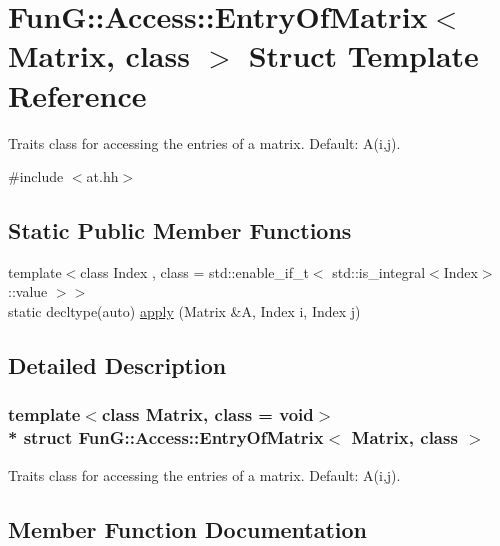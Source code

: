 \hypertarget{structFunG_1_1Access_1_1EntryOfMatrix}{}\section{FunG\+:\+:Access\+:\+:Entry\+Of\+Matrix$<$ Matrix, class $>$ Struct Template Reference}
\label{structFunG_1_1Access_1_1EntryOfMatrix}


Traits class for accessing the entries of a matrix. Default\+: A(i,j).  




{\ttfamily \#include $<$at.\+hh$>$}

\subsection*{Static Public Member Functions}
\begin{DoxyCompactItemize}
\item 
{\footnotesize template$<$class Index , class  = std\+::enable\+\_\+if\+\_\+t$<$ std\+::is\+\_\+integral$<$\+Index$>$\+::value $>$$>$ }\\static decltype(auto) \hyperlink{structFunG_1_1Access_1_1EntryOfMatrix_af098d041cf120371077e576799599055}{apply} (Matrix \&A, Index i, Index j)
\end{DoxyCompactItemize}


\subsection{Detailed Description}
\subsubsection*{template$<$class Matrix, class = void$>$\\*
struct Fun\+G\+::\+Access\+::\+Entry\+Of\+Matrix$<$ Matrix, class $>$}

Traits class for accessing the entries of a matrix. Default\+: A(i,j). 

\subsection{Member Function Documentation}
